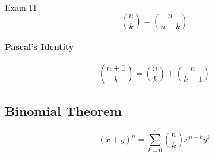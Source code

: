 \documentclass{note}
\begin{document}
\begin{note}{Exam 11}
    \begin{equation}
        \binom{n}{k} = \binom{n}{n - k}
    \end{equation}
    
    \paragraph{Pascal's Identity}
    
    \begin{equation}
        \binom{n + 1}{k} = \binom{n}{k} + \binom{n}{k - 1}
    \end{equation}
    
    \subsection{Binomial Theorem}
    
    \begin{equation}
        \left( x + y \right)^{n} = \sum_{k = 0}^{n} \binom{n}{k} x^{n - k} y^{k}
    \end{equation}

\end{note}
\end{document}
